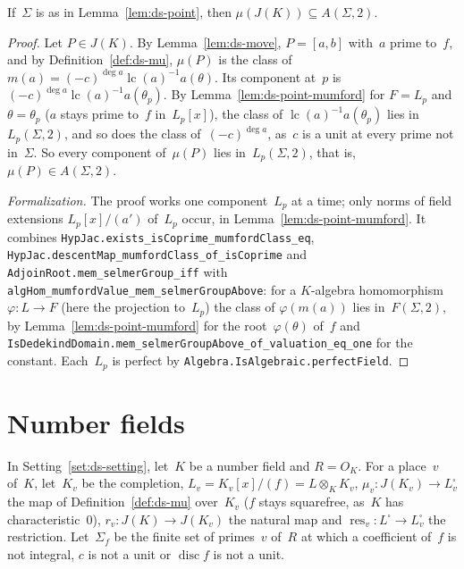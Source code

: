 \begin{theorem}
\label{thm:ds-image-selmer}
\leanok
{}
If~$\Sigma$ is as in Lemma~\ref{lem:ds-point}, then $\mu(J(K)) \subseteq A(\Sigma, 2)$.
\end{theorem}

\begin{proof}
\leanok
{}
Let $P \in J(K)$. By Lemma~\ref{lem:ds-move}, $P = [a, b]$ with~$a$ prime to~$f$, and by
Definition~\ref{def:ds-mu}, $\mu(P)$ is the class of
$m(a) = (-c)^{\deg a}\operatorname{lc}(a)^{-1}a(\theta)$. Its component at~$p$ is
$(-c)^{\deg a}\operatorname{lc}(a)^{-1}a(\theta_p)$. By Lemma~\ref{lem:ds-point-mumford} for
$F = L_p$ and $\theta = \theta_p$ ($a$ stays prime to~$f$ in~$L_p[x]$), the class of
$\operatorname{lc}(a)^{-1}a(\theta_p)$ lies in~$L_p(\Sigma, 2)$, and so does the class
of~$(-c)^{\deg a}$, as~$c$ is a unit at every prime not in~$\Sigma$. So every component
of~$\mu(P)$ lies in~$L_p(\Sigma, 2)$, that is, $\mu(P) \in A(\Sigma, 2)$.

\emph{Formalization.} The proof works one component~$L_p$ at a time; only norms of field extensions
$L_p[x]/(a')$ of~$L_p$ occur, in Lemma~\ref{lem:ds-point-mumford}. It combines
\texttt{HypJac.exists\_isCoprime\_mumfordClass\_eq},
\texttt{HypJac.descentMap\_mumfordClass\_of\_isCoprime} and
\texttt{AdjoinRoot.mem\_selmerGroup\_iff} with \texttt{algHom\_mumfordValue\_mem\_selmerGroupAbove}:
for a $K$-algebra homomorphism $\varphi \colon L \to F$ (here the projection to~$L_p$) the class of
$\varphi(m(a))$ lies in~$F(\Sigma, 2)$, by Lemma~\ref{lem:ds-point-mumford} for the
root~$\varphi(\theta)$ of~$f$ and
\texttt{IsDedekindDomain.mem\_selmerGroupAbove\_of\_valuation\_eq\_one} for the constant. Each~$L_p$
is perfect by \texttt{Algebra.IsAlgebraic.perfectField}.
\end{proof}

\section{Number fields}
\label{sec:ds-number}

\begin{setting}
\label{set:ds-number}
In Setting~\ref{set:ds-setting}, let~$K$ be a number field and $R = O_K$. For a place~$v$ of~$K$,
let~$K_v$ be the completion, $L_v = K_v[x]/(f) = L \otimes_K K_v$,
$\mu_v \colon J(K_v) \to L_v^\square$ the map of Definition~\ref{def:ds-mu} over~$K_v$ ($f$ stays
squarefree, as~$K$ has characteristic~$0$), $r_v \colon J(K) \to J(K_v)$ the natural map and
$\operatorname{res}_v \colon L^\square \to L_v^\square$ the restriction. Let~$\Sigma_f$ be the
finite set of primes~$v$ of~$R$ at which a coefficient of~$f$ is not integral, $c$ is not a unit
or $\operatorname{disc} f$ is not a unit.
\end{setting}

